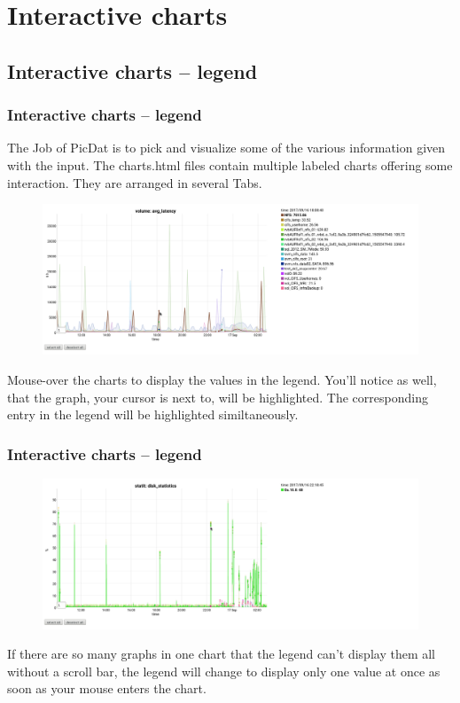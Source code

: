 \documentclass[8pt]{beamer}
\begin{document}
\section{Interactive charts}
\subsection{Interactive charts -- legend}
\begin{frame}
\frametitle{Interactive charts -- legend}
The Job of PicDat is to pick and visualize some of the various information given with the input. The charts.html files contain multiple labeled charts offering some interaction. They are arranged in several Tabs.

\begin{figure}
	\includegraphics[width=\textwidth]{../images/PicDat_highlight2.png}
\end{figure}

Mouse-over the charts to display the values in the legend. You'll notice as well, that the graph, your cursor is next to, will be highlighted. The corresponding entry in the legend will be highlighted similtaneously.
\end{frame}

\begin{frame}
\frametitle{Interactive charts -- legend} 
\begin{figure}
	\includegraphics[width=\textwidth]{../images/PicDat_singleValue.png}
\end{figure}

If there are so many graphs in one chart that the legend can't display them all without a scroll bar, the legend will change to display only one value at once as soon as your mouse enters the chart.
\end{frame}
\end{document}
